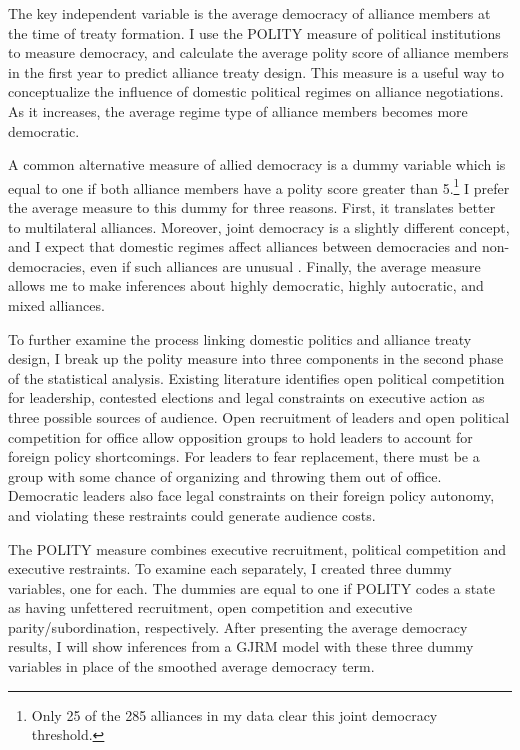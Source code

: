 \documentclass[12pt]{article}
\begin{document}
The key independent variable is the average democracy of alliance members at the time of treaty formation. 
I use the POLITY measure of political institutions to measure democracy, and calculate the average polity score of alliance members in the first year to predict alliance treaty design. 
This measure is a useful way to conceptualize the influence of domestic political regimes on alliance negotiations. 
As it increases, the average regime type of alliance members becomes more democratic. 


A common alternative measure of allied democracy is a dummy variable which is equal to one if both alliance members have a polity score greater than 5.\footnote{Only 25 of the 285 alliances in my data clear this joint democracy threshold.}
I prefer the average measure to this dummy for three reasons.
First, it translates better to multilateral alliances. 
Moreover, joint democracy is a slightly different concept, and I expect that domestic regimes affect alliances between democracies and non-democracies, even if such alliances are unusual \citep{Leeds1999}.
Finally, the average measure allows me to make inferences about highly democratic, highly autocratic, and mixed alliances. 


To further examine the process linking domestic politics and alliance treaty design, I break up the polity measure into three components in the second phase of the statistical analysis. 
Existing literature identifies open political competition for leadership, contested elections and legal constraints on executive action as three possible sources of audience. 
Open recruitment of leaders and open political competition for office allow opposition groups to hold leaders to account for foreign policy shortcomings. 
For leaders to fear replacement, there must be a group with some chance of organizing and throwing them out of office.
Democratic leaders also face legal constraints on their foreign policy autonomy, and violating these restraints could generate audience costs. 

 
The POLITY measure combines executive recruitment, political competition and executive restraints. 
To examine each separately, I created three dummy variables, one for each. 
The dummies are equal to one if POLITY codes a state as having unfettered recruitment, open competition and executive parity/subordination, respectively. 
After presenting the average democracy results, I will show inferences from a GJRM model with these three dummy variables in place of the smoothed average democracy term.  
\end{document}
